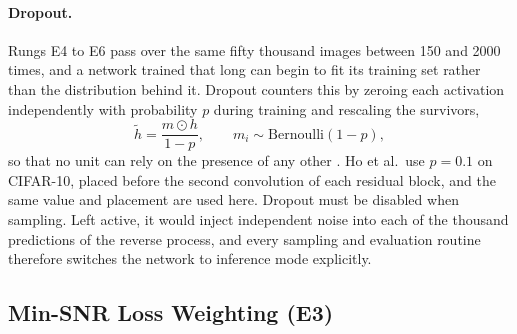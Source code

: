 \paragraph{Dropout.} Rungs E4 to E6 pass over the same fifty thousand images between 150 and 2000
times, and a network trained that long can begin to fit its training set rather than the
distribution behind it. Dropout counters this by zeroing each activation independently with
probability $p$ during training and rescaling the survivors,
\begin{equation}
    \tilde h = \frac{m \odot h}{1 - p}, \qquad m_i \sim \mathrm{Bernoulli}(1 - p),
    \label{eq:ext-dropout}
\end{equation}
so that no unit can rely on the presence of any other \parencite{srivastava2014dropout}. Ho et al.\
use $p = 0.1$ on CIFAR-10, placed before the second convolution of each residual block, and the same
value and placement are used here. Dropout must be disabled when sampling. Left active, it would
inject independent noise into each of the thousand predictions of the reverse process, and every
sampling and evaluation routine therefore switches the network to inference mode explicitly.

\subsection{Min-SNR Loss Weighting (E3)}
\label{sec:ext-minsnr}

